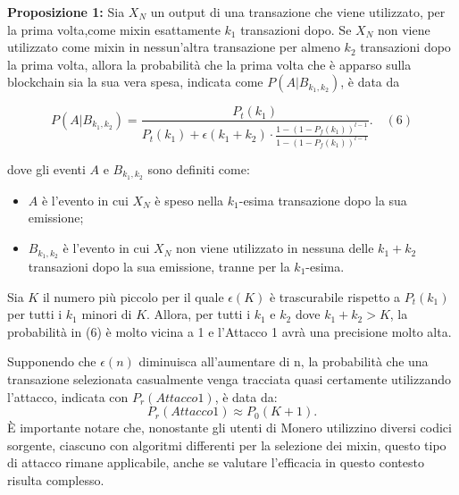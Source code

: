 \textbf{Proposizione 1:} Sia \( X_N \) un output di una transazione che viene utilizzato, per la prima volta,come mixin esattamente \( k_1 \) transazioni dopo. Se \( X_N \) non viene utilizzato come mixin in nessun'altra transazione per almeno \( k_2 \) transazioni dopo la prima volta, allora la probabilità che la prima volta che è apparso sulla blockchain sia la sua vera spesa, indicata come \( P(A|B_{k_1,k_2}) \), è data da

\[ P(A|B_{k_1,k_2}) = \frac{P_t(k_1)}{P_t(k_1) + \epsilon(k_1 + k_2) \cdot \frac{1 - (1 - P_f(k_1))^{l-1}}{1 - (1 - P_f(k_1))^{l-1}}}. \quad (6) \]

dove gli eventi \( A \) e \( B_{k_1,k_2} \) sono definiti come:

\begin{itemize}
    \item \( A \) è l'evento in cui \( X_N \) è speso nella \( k_1 \)-esima transazione dopo la sua emissione;
    \item \( B_{k_1,k_2} \) è l'evento in cui \( X_N \) non viene utilizzato in nessuna delle \( k_1 + k_2 \) transazioni dopo la sua emissione, tranne per la \( k_1 \)-esima.
\end{itemize}

Sia \( K \) il numero più piccolo per il quale \( \epsilon(K) \) è trascurabile rispetto a \( P_t(k_1) \) per tutti i \( k_1 \) minori di \( K \). Allora, per tutti i \( k_1 \) e \( k_2 \) dove \( k_1 + k_2 > K \), la probabilità in (6) è molto vicina a 1 e l'Attacco 1 avrà una precisione molto alta.

Supponendo che $\epsilon(n)$ diminuisca all'aumentare di n, la probabilità che una transazione selezionata casualmente venga tracciata quasi certamente utilizzando l'attacco, indicata con $P_{r}(Attacco 1)$, è data da:
\begin{equation}
    P_{r}(Attacco 1) \approx P_{0}(K+1).
\end{equation}
È importante notare che, nonostante gli utenti di Monero utilizzino diversi codici sorgente, ciascuno con algoritmi differenti per la selezione dei mixin, questo tipo di attacco rimane applicabile, anche se valutare l'efficacia in questo contesto risulta complesso.